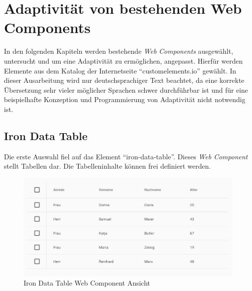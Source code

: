 \documentclass[12pt, paper=a4, bibtotoc, toc=listof, headsepline=true]{scrreprt}
\begin{document}
	
\chapter{Adaptivität von bestehenden Web Components}
	In den folgenden Kapiteln werden bestehende \emph{Web Components} ausgewählt, untersucht und um eine Adaptivität zu ermöglichen, angepasst. Hierfür werden Elemente aus dem Katalog der Internetseite \enquote{customelements.io} gewählt\cite{cusEleIo}. In dieser Ausarbeitung wird nur deutschsprachiger Text beachtet, da eine korrekte Übersetzung sehr vieler möglicher Sprachen schwer durchführbar ist und für eine beispielhafte Konzeption und Programmierung von Adaptivität nicht notwendig ist.
	\section{Iron Data Table}
	Die erste Auswahl fiel auf das Element \enquote{iron-data-table}\cite{saulis}. Dieses \emph{Web Component} stellt Tabellen dar. Die Tabelleninhalte können frei definiert werden.
	\begin{figure}[H]		
		\centering
		\includegraphics[width=\textwidth,height=\textheight,keepaspectratio]{datTab.png}
		\caption[Iron Data Table]{Iron Data Table Web Component Ansicht}
		\label{img:datTab}
	\end{figure}
\end{document}
